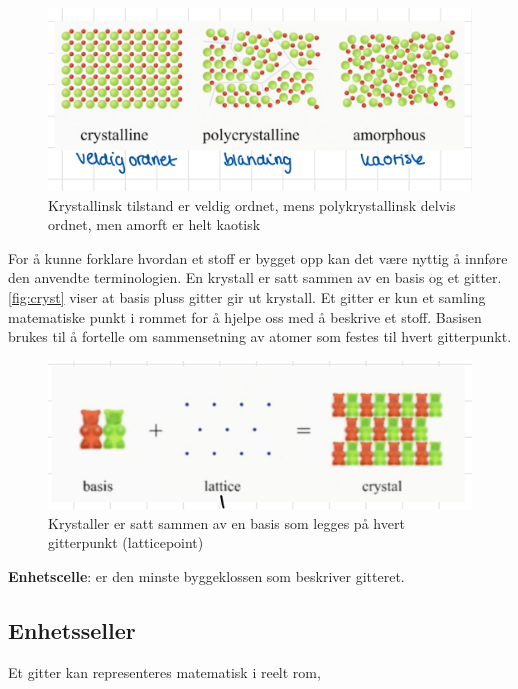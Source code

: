 \begin{figure}[!htb]
    \centering
    \includegraphics[scale=0.2]{Bilder/SamtaleTema4/Faste Stoffer/faserr.jpeg}
    \caption{Krystallinsk tilstand er veldig ordnet, mens polykrystallinsk delvis ordnet, men amorft er helt kaotisk}
    \label{fig:EskempelOppbygning}
\end{figure}

For å kunne forklare hvordan et stoff er bygget opp kan det være nyttig å innføre den anvendte terminologien. En krystall er satt sammen av en basis og et gitter. \autoref{fig:cryst} viser at basis pluss gitter gir ut krystall. Et gitter er kun et samling matematiske punkt i rommet for å hjelpe oss med å beskrive et stoff. Basisen brukes til å fortelle om sammensetning av atomer som festes til hvert gitterpunkt.

\begin{figure}[!htb]
    \centering
    \includegraphics[scale=0.15]{Bilder/SamtaleTema4/Faste Stoffer/krystallKlosser.jpeg}
    \caption{Krystaller er satt sammen av en basis som legges på hvert gitterpunkt (latticepoint)}
    \label{fig:cryst}
\end{figure}

\begin{definition}
    \textbf{Enhetscelle}: er den minste byggeklossen som beskriver gitteret.
\end{definition}

\subsection{Enhetsseller}
\label{sec:tema4_3}
Et gitter kan representeres matematisk i reelt rom,

